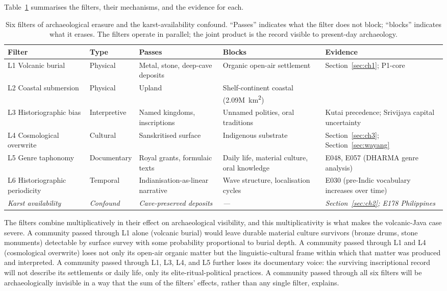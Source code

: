 \documentclass[12pt,a4paper]{article}
\begin{document}
Table~\ref{tab:filters} summarises the filters, their mechanisms, and the evidence for each.

\begin{table}[t]
\caption{Six filters of archaeological erasure and the karst-availability confound. ``Passes'' indicates what the filter does not block; ``blocks'' indicates what it erases. The filters operate in parallel; the joint product is the record visible to present-day archaeology.}
\label{tab:filters}
\begin{tabular}{p{1.6cm}p{2.6cm}p{3.2cm}p{3cm}p{3cm}}
\toprule
Filter & Type & Passes & Blocks & Evidence \\
\midrule
L1 Volcanic burial & Physical & Metal, stone, deep-cave deposits & Organic open-air settlement & Section~\ref{sec:ch1}; P1-core \\
L2 Coastal submersion & Physical & Upland & Shelf-continent coastal (2.09M~km\textsuperscript{2}) & \citealp{oppenheimer1998} \\
L3 Historio\-graphic bias & Interpretive & Named kingdoms, inscriptions & Unnamed polities, oral traditions & Kutai precedence; Srivijaya capital uncertainty \\
L4 Cosmological overwrite & Cultural & Sanskritised surface & Indigenous substrate & Section~\ref{sec:ch3}; Section~\ref{sec:wayang} \\
L5 Genre taphonomy & Documentary & Royal grants, formulaic texts & Daily life, material culture, oral knowledge & E048, E057 (DHARMA genre analysis) \\
L6 Historio\-graphic periodicity & Temporal & Indianisation-as-linear narrative & Wave structure, localisation cycles & E030 (pre-Indic vocabulary increases over time) \\
\midrule
\textit{Karst availability} & \textit{Confound} & \textit{Cave-preserved deposits} & \textit{---} & \textit{Section~\ref{sec:ch2}; E178 Philippines} \\
\bottomrule
\end{tabular}
\end{table}

The filters combine multiplicatively in their effect on archaeological visibility, and this multiplicativity is what makes the volcanic-Java case severe. A community passed through L1 alone (volcanic burial) would leave durable material culture survivors (bronze drums, stone monuments) detectable by surface survey with some probability proportional to burial depth. A community passed through L1 and L4 (cosmological overwrite) loses not only its open-air organic matter but the linguistic-cultural frame within which that matter was produced and interpreted. A community passed through L1, L3, L4, and L5 further loses its documentary voice: the surviving inscriptional record will not describe its settlements or daily life, only its elite-ritual-political practices. A community passed through all six filters will be archaeologically invisible in a way that the sum of the filters' effects, rather than any single filter, explains.
\end{document}
